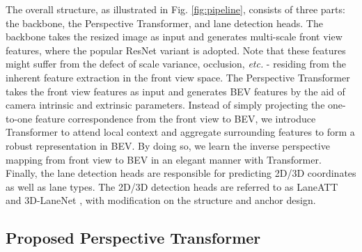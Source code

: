 \documentclass[runningheads]{llncs}
\begin{document}
The overall structure, as illustrated in Fig. \ref{fig:pipeline}, consists of three parts: the backbone, the Perspective Transformer, and lane detection heads.
The backbone takes the resized image as input and generates multi-scale front view features, 
where the popular ResNet variant \cite{tan2019efficientnet} is adopted.
Note that these features might suffer from the defect of scale variance, occlusion,\textit{ etc.} - residing from the inherent feature extraction in the front view space.
The Perspective Transformer takes the front view features as input and generates BEV features by the aid of camera intrinsic and extrinsic parameters. 
Instead of simply projecting the one-to-one feature correspondence from the front view to BEV, we introduce Transformer to attend local context 
and aggregate surrounding features to form a robust representation in BEV.
By doing so, we learn the inverse perspective mapping from front view to BEV in an elegant manner with Transformer.
Finally, the lane detection heads are responsible for predicting 2D/3D coordinates as well as lane types.
The 2D/3D detection heads are referred to as LaneATT \cite{tabelini2021keep} and 3D-LaneNet \cite{Garnett_2019_ICCV}, with modification on the structure and anchor design.








\subsection{Proposed Perspective Transformer}\label{sec: alg - transformer}
\end{document}
